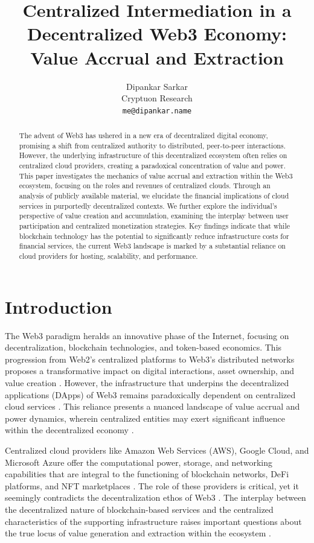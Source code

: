 \documentclass{article}
\title{Centralized Intermediation in a Decentralized Web3 Economy: Value Accrual and Extraction}
\author{Dipankar Sarkar \\
  Cryptuon Research \\
  \texttt{me@dipankar.name} \\
}
\begin{document}
\maketitle

\begin{abstract}
 The advent of Web3 has ushered in a new era of decentralized digital economy, promising a shift from centralized authority to distributed, peer-to-peer interactions. However, the underlying infrastructure of this decentralized ecosystem often relies on centralized cloud providers, creating a paradoxical concentration of value and power. This paper investigates the mechanics of value accrual and extraction within the Web3 ecosystem, focusing on the roles and revenues of centralized clouds. Through an analysis of publicly available material, we elucidate the financial implications of cloud services in purportedly decentralized contexts. We further explore the individual's perspective of value creation and accumulation, examining the interplay between user participation and centralized monetization strategies. Key findings indicate that while blockchain technology has the potential to significantly reduce infrastructure costs for financial services, the current Web3 landscape is marked by a substantial reliance on cloud providers for hosting, scalability, and performance.
\end{abstract}


\section{Introduction}

The Web3 paradigm heralds an innovative phase of the Internet, focusing on decentralization, blockchain technologies, and token-based economics. This progression from Web2's centralized platforms to Web3's distributed networks proposes a transformative impact on digital interactions, asset ownership, and value creation \cite{tapscott2016blockchain}. However, the infrastructure that underpins the decentralized applications (DApps) of Web3 remains paradoxically dependent on centralized cloud services \cite{mazieres2019stellar}. This reliance presents a nuanced landscape of value accrual and power dynamics, wherein centralized entities may exert significant influence within the decentralized economy \cite{binanceresearch2021defi}.

Centralized cloud providers like Amazon Web Services (AWS), Google Cloud, and Microsoft Azure offer the computational power, storage, and networking capabilities that are integral to the functioning of blockchain networks, DeFi platforms, and NFT marketplaces \cite{zheng2018blockchain}. The role of these providers is critical, yet it seemingly contradicts the decentralization ethos of Web3 \cite{swan2015blockchain}. The interplay between the decentralized nature of blockchain-based services and the centralized characteristics of the supporting infrastructure raises important questions about the true locus of value generation and extraction within the ecosystem \cite{catalinigans2020}.
\end{document}

